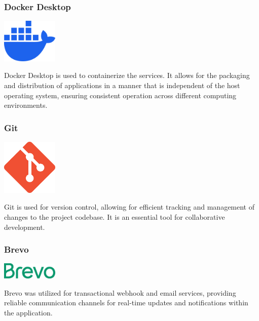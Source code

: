 \subsubsection*{Docker Desktop}
\begin{center}
\includegraphics[width=0.2\textwidth]{Images/logos/docker-mark-blue.png}
\label{fig:docker}
\end{center}
Docker Desktop is used to containerize the services. It allows for the packaging and distribution of applications in a manner that is independent of the host operating system, ensuring consistent operation across different computing environments.

\subsubsection*{Git}
\begin{center}
\includegraphics[width=0.2\textwidth]{Images/logos/Git-Icon-1788C.png}
\label{fig:git}
\end{center}
Git is used for version control, allowing for efficient tracking and management of changes to the project codebase. It is an essential tool for collaborative development.

\subsubsection*{Brevo}
\begin{center}
    \includegraphics[width=0.2\textwidth]{Images/logos/Brevo-Logo.png}
    \label{fig:brevo}
    \end{center}
Brevo was utilized for transactional webhook and email services, providing reliable communication channels for real-time updates and notifications within the application.
